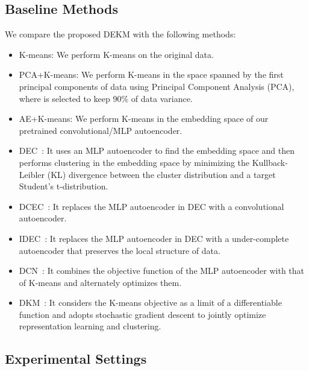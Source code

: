 \subsection{Baseline Methods}
We compare the proposed DEKM with the following methods:
\begin{itemize}
	\item K-means: We perform K-means on the original data.
	\item PCA+K-means: We perform K-means in the space spanned by the first  principal components of data using Principal Component Analysis (PCA), where  is selected to keep  90\% of data variance. 
	\item AE+K-means: We perform K-means in the embedding space of our pretrained convolutional/MLP autoencoder.
	\item DEC~\cite{DEC_xie2016unsupervised}: It uses an MLP autoencoder to find the embedding space and then performs clustering in the embedding space by minimizing the Kullback-Leibler (KL) divergence between the cluster distribution and a target Student’s t-distribution. 
	\item DCEC~\cite{DCEC_guo2017deep}: It replaces the MLP autoencoder in DEC with a convolutional autoencoder.
	\item IDEC~\cite{IDEC_guo2017improved}: It replaces the MLP autoencoder in DEC with a under-complete autoencoder that preserves the local structure of data.
	\item DCN~\cite{DCN_yang2017towards}: It combines the objective function of the MLP autoencoder with that of K-means and alternately optimizes them.
	\item DKM~\cite{fard2020deep}: It considers the K-means objective as a limit of a differentiable function and adopts stochastic gradient descent to jointly optimize representation learning and clustering.
\end{itemize} 

\subsection{Experimental Settings}

